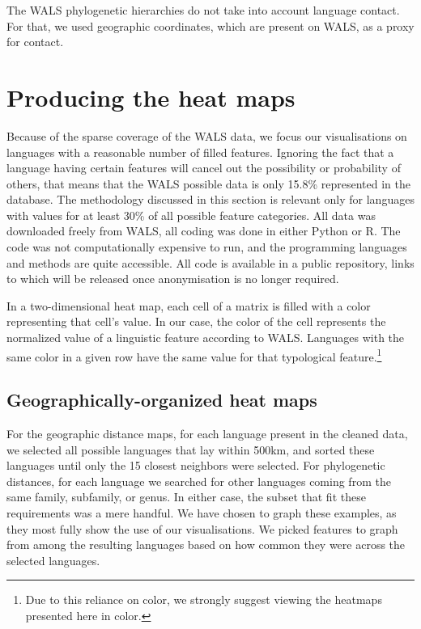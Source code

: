 \documentclass[11pt]{article}
\begin{document}
The WALS phylogenetic hierarchies do not take into account language contact. For that, we used geographic coordinates, which are present on WALS, as a proxy for contact. 



\section{Producing the heat maps}

Because of the sparse coverage of the WALS data, we focus our visualisations on languages with a reasonable number of filled features.
Ignoring the fact that a language having certain features will cancel out the possibility or probability of others, that means that the WALS possible data is only 15.8\% represented in the database. %
 The methodology discussed in this section is relevant only for languages with values for at least 30\% of all possible feature categories. 
All data was downloaded freely from WALS, all coding was done in either Python or R. The code was not computationally expensive to run, and the programming languages and methods are quite accessible. All code is available in a public repository, links to which will be released once anonymisation is no longer required.

In a two-dimensional heat map, each cell of a matrix is filled with a color representing that cell's value. In our case, the color of the cell represents the normalized value of a linguistic feature according to WALS. Languages with the same color in a given row have the same value for that typological feature.\footnote{Due to this reliance on color, we strongly suggest viewing the heatmaps presented here in color.}

\subsection{Geographically-organized heat maps}
For the geographic distance maps, for each language present in the cleaned data, we selected all possible languages that lay within 500km, and sorted these languages until only the 15 closest neighbors were selected. For phylogenetic distances, for each language we searched for other languages coming from the same family, subfamily, or genus. In either case, the subset that fit these requirements was a mere handful. We have chosen to graph these examples, as they most fully show the use of our visualisations. We picked features to graph from among the resulting languages based on how common they were across the selected languages. 
\end{document}
